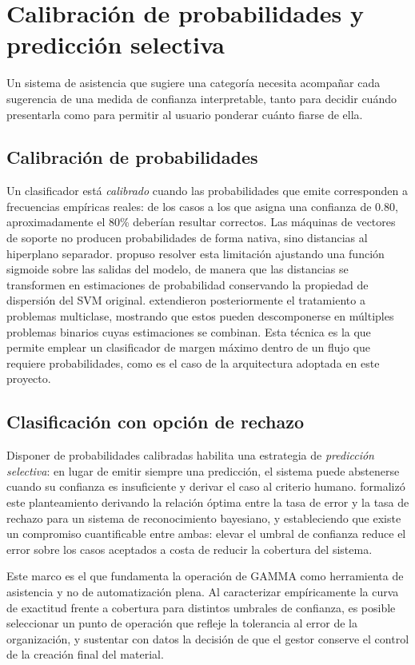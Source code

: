 \section{Calibración de probabilidades y predicción selectiva}
Un sistema de asistencia que sugiere una categoría necesita acompañar cada sugerencia de una medida de confianza interpretable, tanto para decidir cuándo presentarla como para permitir al usuario ponderar cuánto fiarse de ella.

\subsection{Calibración de probabilidades}
Un clasificador está \textit{calibrado} cuando las probabilidades que emite corresponden a frecuencias empíricas reales: de los casos a los que asigna una confianza de 0.80, aproximadamente el 80\% deberían resultar correctos. Las máquinas de vectores de soporte no producen probabilidades de forma nativa, sino distancias al hiperplano separador.  propuso resolver esta limitación ajustando una función sigmoide sobre las salidas del modelo, de manera que las distancias se transformen en estimaciones de probabilidad conservando la propiedad de dispersión del SVM original.  extendieron posteriormente el tratamiento a problemas multiclase, mostrando que estos pueden descomponerse en múltiples problemas binarios cuyas estimaciones se combinan. Esta técnica es la que permite emplear un clasificador de margen máximo dentro de un flujo que requiere probabilidades, como es el caso de la arquitectura adoptada en este proyecto.

\subsection{Clasificación con opción de rechazo}
Disponer de probabilidades calibradas habilita una estrategia de \textit{predicción selectiva}: en lugar de emitir siempre una predicción, el sistema puede abstenerse cuando su confianza es insuficiente y derivar el caso al criterio humano.  formalizó este planteamiento derivando la relación óptima entre la tasa de error y la tasa de rechazo para un sistema de reconocimiento bayesiano, y estableciendo que existe un compromiso cuantificable entre ambas: elevar el umbral de confianza reduce el error sobre los casos aceptados a costa de reducir la cobertura del sistema.

Este marco es el que fundamenta la operación de GAMMA como herramienta de asistencia y no de automatización plena. Al caracterizar empíricamente la curva de exactitud frente a cobertura para distintos umbrales de confianza, es posible seleccionar un punto de operación que refleje la tolerancia al error de la organización, y sustentar con datos la decisión de que el gestor conserve el control de la creación final del material.

